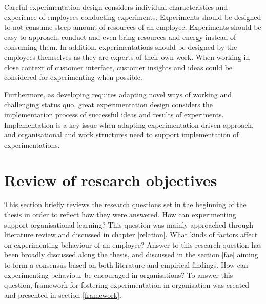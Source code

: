 Careful experimentation design considers individual characteristics and experience of employees conducting experiments. Experiments should be designed to not consume steep amount of resources of an employee. Experiments should be easy to approach, conduct and even bring resources and energy instead of consuming them. In addition, experimentations should be designed by the employees themselves as they are experts of their own work. When working in close context of customer interface, customer insights and ideas could be considered for experimenting when possible. 

Furthermore, as developing requires adapting novel ways of working and challenging status quo, great experimentation design considers the implementation process of successful ideas and results of experiments. Implementation is a key issue when adapting experimentation-driven approach, and organisational and work structures need to support implementation of experimentations. 

\section{Review of research objectives}
This section briefly reviews the research questions set in the beginning of the thesis in order to reflect how they were answered. 
\newline
\newline
How can experimenting support organisational learning? \newline
\newline
This question was mainly approached through literature review and discussed in chapter \ref{relation}. 
\newline
\newline
What kinds of factors affect on experimenting behaviour of an employee?\newline
\newline
Answer to this research question has been broadly discussed along the thesis, and discussed in the section \ref{fae} aiming to form a consensus based on both literature and empirical findings. 
\newline
\newline
How can experimenting behaviour be encouraged in organisations? \newline
\newline
To answer this question, framework for fostering experimentation in organisation was created and presented in section \ref{framework}. 

